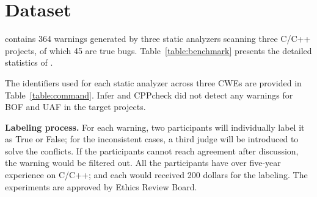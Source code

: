 \section{Dataset }
\label{ap:dataset}


\ourbench{} contains 364 warnings generated by three static analyzers scanning three C/C++ projects, of which 45 are true bugs. Table~\ref{table:benchmark} presents the detailed statistics of \ourbench{}.


The identifiers used for each static analyzer across three CWEs are provided in Table~\ref{table:command}. Infer and CPPcheck did not detect any warnings for BOF and UAF in the target projects.



\textbf{Labeling process.} For each warning, two participants will individually label it as True or False; for the inconsistent cases, a third judge will be introduced to solve the conflicts. If the participants cannot reach agreement after discussion, the warning would be filtered out. All the participants have over five-year experience on C/C++; and each would received 200 dollars for the labeling. The experiments are approved by Ethics Review Board.
